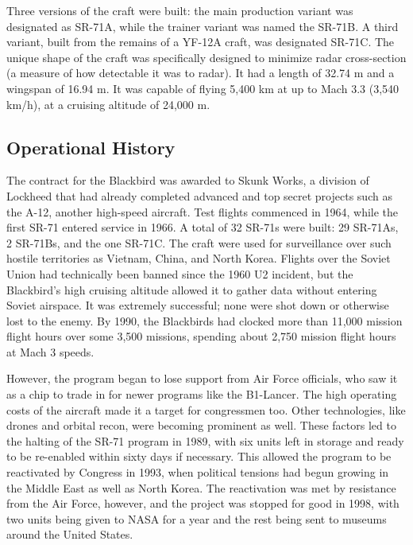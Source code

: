 \documentclass[12pt, draftclsnofoot, onecolumn]{IEEEtran}
\begin{document}
	Three versions of the craft were built: the main production variant was designated as SR-71A, while the trainer variant was named the SR-71B. A third variant, built from the remains of a YF-12A craft, was designated SR-71C.
	The unique shape of the craft was specifically designed to minimize radar cross-section (a measure of how detectable it was to radar). It had a length of 32.74 m and a wingspan of 16.94 m. It was capable of flying 5,400 km at up to Mach 3.3 (3,540 km/h), at a cruising altitude of 24,000 m.


	\subsection{Operational History}
	The contract for the Blackbird was awarded to Skunk Works, a division of Lockheed that had already completed advanced and top secret projects such as the A-12, another high-speed aircraft. Test flights commenced in 1964, while the first SR-71 entered service in 1966. A total of 32 SR-71s were built: 29 SR-71As, 2 SR-71Bs, and the one SR-71C. The craft were used for surveillance over such hostile territories as Vietnam, China, and North Korea. Flights over the Soviet Union had technically been banned since the 1960 U2 incident, but the Blackbird's high cruising altitude allowed it to gather data without entering Soviet airspace. It was extremely successful; none were shot down or otherwise lost to the enemy. By 1990, the Blackbirds had clocked more than 11,000 mission flight hours over some 3,500 missions, spending about 2,750 mission flight hours at Mach 3 speeds\cite{stats}.

	However, the program began to lose support from Air Force officials, who saw it as a chip to trade in for newer programs like the B1-Lancer. The high operating costs of the aircraft made it a target for congressmen too\cite{stats}. Other technologies, like drones and orbital recon, were becoming prominent as well. These factors led to the halting of the SR-71 program in 1989, with six units left in storage and ready to be re-enabled within sixty days if necessary. This allowed the program to be reactivated by Congress in 1993, when political tensions had begun growing in the Middle East as well as North Korea\cite{retirement}. The reactivation was met by resistance from the Air Force, however, and the project was stopped for good in 1998, with two units being given to NASA for a year and the rest being sent to museums around the United States.
	
\end{document}
